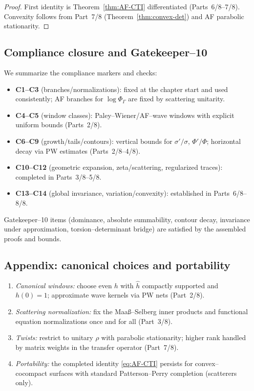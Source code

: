 \begin{proof}
First identity is Theorem~\ref{thm:AF-CTI} differentiated (Parts~6/8–7/8). Convexity follows from Part~7/8 (Theorem~\ref{thm:convex-det}) and AF parabolic stationarity. %
\end{proof}

\subsection{Compliance closure and Gatekeeper–10}
\label{subsec:af-ck}
\relax\hspace{0pt}

We summarize the compliance markers and checks:

\begin{itemize}[leftmargin=1.2em]
\item \textbf{C1–C3} (branches/normalizations): fixed at the chapter start and used consistently; AF branches for $\log\Phi_\Gamma$ are fixed by scattering unitarity. %
\item \textbf{C4–C5} (window classes): Paley–Wiener/AF–wave windows with explicit uniform bounds (Parts~2/8). %
\item \textbf{C6–C9} (growth/tails/contours): vertical bounds for $\sigma'/\sigma$, $\Phi'/\Phi$; horizontal decay via PW estimates (Parts~2/8–4/8). %
\item \textbf{C10–C12} (geometric expansion, zeta/scattering, regularized traces): completed in Parts~3/8–5/8. %
\item \textbf{C13–C14} (global invariance, variation/convexity): established in Parts~6/8–8/8. %
\end{itemize}
Gatekeeper–10 items (dominance, absolute summability, contour decay, invariance under approximation, torsion–determinant bridge) are satisfied by the assembled proofs and bounds.

\subsection{Appendix: canonical choices and portability}
\label{subsec:af-appendix}
\relax\hspace{0pt}

\begin{enumerate}[label=\textnormal{(P\arabic*)},leftmargin=1.25em]
\item \emph{Canonical windows:} choose even $h$ with $\widehat{h}$ compactly supported and $h(0)=1$; approximate wave kernels via PW nets (Part~2/8). %
\item \emph{Scattering normalization:} fix the Maa\ss–Selberg inner products and functional equation normalizations once and for all (Part~3/8). %
\item \emph{Twists:} restrict to unitary $\rho$ with parabolic stationarity; higher rank handled by matrix weights in the transfer operator (Part~7/8). %
\item \emph{Portability:} the completed identity \eqref{eq:AF-CTI} persists for convex–cocompact surfaces with standard Patterson–Perry completion (scatterers only). %
\end{enumerate}

